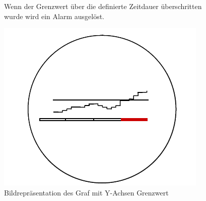\documentclass[a4paper,10pt]{scrartcl}
\begin{document}
\begin{figure}[htbp]
\begin{minipage}[t]{6cm}
\vspace{0pt}
Wenn der Grenzwert über die definierte Zeitdauer überschritten wurde wird ein Alarm ausgelöst.\\
\end{minipage}
\hfill
\begin{minipage}[t]{6cm}
\vspace{0pt}
\centering
  \includegraphics[scale=.3]{img/Datenaggregation/GrafAlarmNew.png} 
\caption{Bildrepräsentation des Graf mit Y-Achsen Grenzwert}
\label{fig:Bild1}
\end{minipage}
\end{figure}
\end{document}
